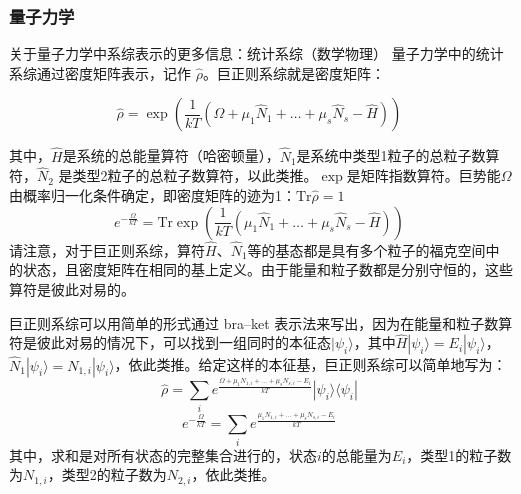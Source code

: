 \subsubsection{量子力学}
关于量子力学中系综表示的更多信息：统计系综（数学物理）
量子力学中的统计系综通过密度矩阵表示，记作 \( \hat{\rho} \)。巨正则系综就是密度矩阵：

\[
\hat{\rho} = \exp \left( \frac{1}{kT} \left( \Omega + \mu_1 \hat{N}_1 + \dots + \mu_s \hat{N}_s - \hat{H} \right) \right)~
\]

其中，\( \hat{H} \)是系统的总能量算符（哈密顿量），\( \hat{N}_1 \)是系统中类型1粒子的总粒子数算符，\( \hat{N}_2 \) 是类型2粒子的总粒子数算符，以此类推。\( \exp \)是矩阵指数算符。巨势能\( \Omega \)由概率归一化条件确定，即密度矩阵的迹为1：\(\text{Tr} \hat{\rho} = 1\)
\[
e^{-\frac{\Omega}{kT}} = \text{Tr} \exp \left( \frac{1}{kT} \left( \mu_1 \hat{N}_1 + \dots + \mu_s \hat{N}_s - \hat{H} \right) \right)~
\]
请注意，对于巨正则系综，算符\( \hat{H} \)、\( \hat{N}_1 \)等的基态都是具有多个粒子的福克空间中的状态，且密度矩阵在相同的基上定义。由于能量和粒子数都是分别守恒的，这些算符是彼此对易的。

巨正则系综可以用简单的形式通过 bra–ket 表示法来写出，因为在能量和粒子数算符是彼此对易的情况下，可以找到一组同时的本征态\( |\psi_i \rangle \)，其中\( \hat{H}|\psi_i \rangle = E_i |\psi_i \rangle \)，\( \hat{N}_1 |\psi_i \rangle = N_{1,i} |\psi_i \rangle \)，依此类推。给定这样的本征基，巨正则系综可以简单地写为：
\[
\hat{\rho} = \sum_i e^{\frac{\Omega + \mu_1 N_{1,i} + \dots + \mu_s N_{s,i} - E_i}{kT}} |\psi_i \rangle \langle \psi_i |~
\]
\[
e^{-\frac{\Omega}{kT}} = \sum_i e^{\frac{\mu_1 N_{1,i} + \dots + \mu_s N_{s,i} - E_i}{kT}}~
\]
其中，求和是对所有状态的完整集合进行的，状态\( i \)的总能量为\( E_i \)，类型1的粒子数为\( N_{1,i} \)，类型2的粒子数为\( N_{2,i} \)，依此类推。
